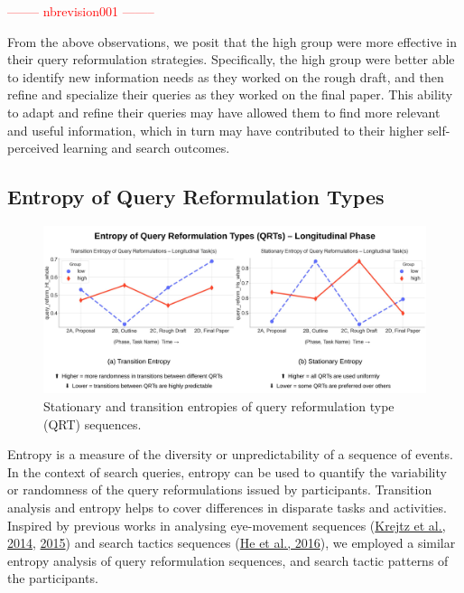 \documentclass[letterpaper, nobind]{templates/ociamthesis}
\begin{document}
\textcolor{red}{-------- nbrevision001 --------}

From the above observations, we posit that the high group were more effective in their query reformulation strategies.
Specifically, the high group were better able to identify new information needs as they worked on the rough draft, and then refine and specialize their queries as they worked on the final paper.
This ability to adapt and refine their queries may have allowed them to find more relevant and useful information, which in turn may have contributed to their higher self-perceived learning and search outcomes.

\hypertarget{sec-res-phase2-query-H}{%
\subsection{Entropy of Query Reformulation Types}\label{sec-res-phase2-query-H}}

\begin{figure}

{\centering \includegraphics[width=1\linewidth]{figs/rp2-qrt-entropy} 

}

\caption[Entropy of Query Reformulation Types for the Longitudinal Phase.]{Stationary and transition entropies of query reformulation type (QRT) sequences.}\label{fig:rp2-qrt-entropy}
\end{figure}





Entropy is a measure of the diversity or unpredictability of a sequence of events. In the context of search queries, entropy can be used to quantify the variability or randomness of the query reformulations issued by participants.
Transition analysis and entropy helps to cover differences in disparate tasks and activities.
Inspired by previous works in analysing eye-movement sequences (\protect\hyperlink{ref-krejtz2014entropy}{Krejtz et al., 2014}, \protect\hyperlink{ref-krejtz2015gaze}{2015}) and search tactics sequences (\protect\hyperlink{ref-he2016beyond}{He et al., 2016}), we employed a similar entropy analysis of query reformulation sequences, and search tactic patterns of the participants.
\end{document}
